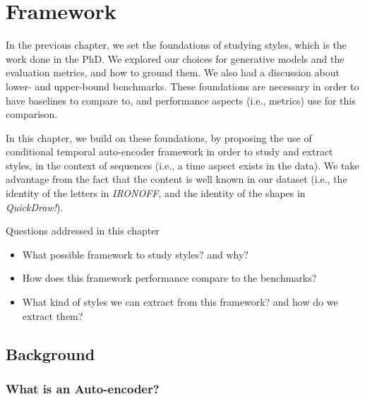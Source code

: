 \chapter{Framework} \label{ch:framework}
\minitoc%

\par In the previous chapter, we set the foundations of studying styles, which is the work done in the PhD. We explored our choices for generative models and the evaluation metrics, and how to ground them. We also had a discussion about lower- and upper-bound benchmarks. These foundations are necessary in order to have baselines to compare to, and performance aspects (i.e., metrics) use for this comparison. %

\par In this chapter, we build on these foundations, by proposing the use of conditional temporal auto-encoder framework in order to study and extract styles, in the context of sequences (i.e., a time aspect exists in the data). We take advantage from the fact that the content is well known in our dataset (i.e., the identity of the letters in \textit{IRONOFF}, and the identity of the shapes in \textit{QuickDraw!}).

\begin{mdframed}[backgroundcolor=blue!20]
    \begin{center}
        Questions addressed in this chapter
    \end{center}

    \begin{itemize}
        \item What possible framework to study styles? and why?
        \item How does this framework performance compare to the benchmarks?
        \item What kind of styles we can extract from this framework? and how do we extract them?
    \end{itemize}
\end{mdframed}

\clearpage

\section{Background}
  \subsection{What is an Auto-encoder?}\label{sec:autoencoder}

